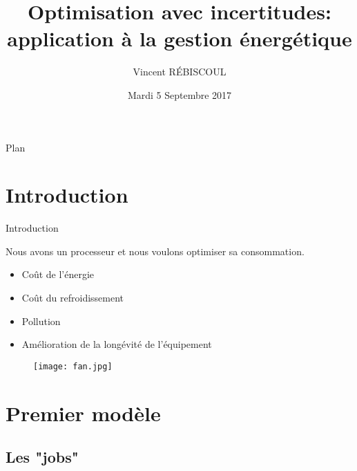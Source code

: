 \documentclass{beamer}
\title[Stage Inria]{Optimisation avec incertitudes: application à la gestion
  énergétique}
\author{Vincent RÉBISCOUL}
\institute{École Normale Supérieure de Lyon}
\date{Mardi 5 Septembre 2017}
\begin{document}
\begin{frame}
  \titlepage
\end{frame}


\begin{frame}{Plan\textsc{}}
  \tableofcontents
\end{frame}

\section{Introduction}
\begin{frame}{Introduction}

  Nous avons un processeur et nous voulons optimiser sa consommation.

  \begin{itemize}
  \item Coût de l'énergie
  \item Coût du refroidissement
  \item Pollution
  \item Amélioration de la longévité de l'équipement
  \end{itemize}
  
  \begin{figure}
    \centering
    \texttt{[image: fan.jpg]}
  \end{figure}
\end{frame}

\section{Premier modèle}

\subsection{Les "jobs"}
\end{document}
